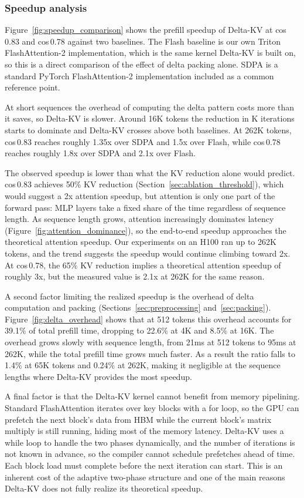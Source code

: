 \subsubsection{Speedup analysis}

Figure~\ref{fig:speedup_comparison} shows the prefill speedup of Delta-KV at cos\,0.83 and cos\,0.78 against two baselines.
The Flash baseline is our own Triton FlashAttention-2 implementation, which is the same kernel Delta-KV is built on, so this is a direct comparison of the effect of delta packing alone.
SDPA is a standard PyTorch FlashAttention-2 implementation included as a common reference point.

At short sequences the overhead of computing the delta pattern costs more than it saves, so Delta-KV is slower.
Around 16K tokens the reduction in K iterations starts to dominate and Delta-KV crosses above both baselines.
At 262K tokens, cos\,0.83 reaches roughly 1.35x over SDPA and 1.5x over Flash, while cos\,0.78 reaches roughly 1.8x over SDPA and 2.1x over Flash.

The observed speedup is lower than what the KV reduction alone would predict.
cos\,0.83 achieves 50\% KV reduction (Section~\ref{sec:ablation_threshold}), which would suggest a 2x attention speedup, but attention is only one part of the forward pass: MLP layers take a fixed share of the time regardless of sequence length.
As sequence length grows, attention increasingly dominates latency (Figure~\ref{fig:attention_dominance}), so the end-to-end speedup approaches the theoretical attention speedup.
Our experiments on an H100 ran up to 262K tokens, and the trend suggests the speedup would continue climbing toward 2x.
At cos\,0.78, the 65\% KV reduction implies a theoretical attention speedup of roughly 3x, but the measured value is 2.1x at 262K for the same reason.

A second factor limiting the realized speedup is the overhead of delta computation and packing (Sections~\ref{sec:preprocessing} and~\ref{sec:packing}).
Figure~\ref{fig:delta_overhead} shows that at 512 tokens this overhead accounts for 39.1\% of total prefill time, dropping to 22.6\% at 4K and 8.5\% at 16K.
The overhead grows slowly with sequence length, from 21ms at 512 tokens to 95ms at 262K, while the total prefill time grows much faster.
As a result the ratio falls to 1.4\% at 65K tokens and 0.24\% at 262K, making it negligible at the sequence lengths where Delta-KV provides the most speedup.

A final factor is that the Delta-KV kernel cannot benefit from memory pipelining.
Standard FlashAttention iterates over key blocks with a for loop, so the GPU can prefetch the next block's data from HBM while the current block's matrix multiply is still running, hiding most of the memory latency.
Delta-KV uses a while loop to handle the two phases dynamically, and the number of iterations is not known in advance, so the compiler cannot schedule prefetches ahead of time.
Each block load must complete before the next iteration can start.
This is an inherent cost of the adaptive two-phase structure and one of the main reasons Delta-KV does not fully realize its theoretical speedup.





